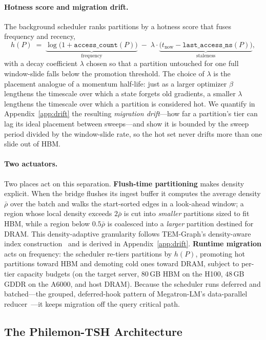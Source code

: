 \documentclass[10pt]{article}
\theoremstyle{definition}
\begin{document}
\paragraph{Hotness score and migration drift.}
The background scheduler ranks partitions by a hotness score that fuses frequency
and recency,
\[
  h(P) \;=\; \underbrace{\log\!\big(1 + \texttt{access\_count}(P)\big)}_{\text{frequency}}
            \;-\; \lambda \cdot \underbrace{\big(t_{\text{now}} - \texttt{last\_access\_ns}(P)\big)}_{\text{staleness}},
\]
with a decay coefficient $\lambda$ chosen so that a partition untouched for one
full window-slide falls below the promotion threshold. The choice of $\lambda$ is
the placement analogue of a momentum half-life: just as a larger optimizer
$\beta$ lengthens the timescale over which a state forgets old gradients, a smaller
$\lambda$ lengthens the timescale over which a partition is considered hot. We
quantify in Appendix~\ref{app:drift} the resulting \emph{migration drift}---how far
a partition's tier can lag its ideal placement between sweeps---and show it is
bounded by the sweep period divided by the window-slide rate, so the hot set never
drifts more than one slide out of HBM.

\paragraph{Two actuators.}
Two places act on this separation. \textbf{Flush-time partitioning} makes density
explicit. When the bridge flushes its ingest buffer it computes the average density
$\bar\rho$ over the batch and walks the start-sorted edges in a look-ahead window;
a region whose local density exceeds $2\bar\rho$ is cut into \emph{smaller}
partitions sized to fit HBM, while a region below $0.5\bar\rho$ is coalesced into a
\emph{larger} partition destined for DRAM. This density-adaptive granularity
follows TEM-Graph's density-aware index construction~\citep{temgraph} and is
derived in Appendix~\ref{app:drift}. \textbf{Runtime migration} acts on frequency:
the scheduler re-tiers partitions by $h(P)$, promoting hot partitions toward HBM
and demoting cold ones toward DRAM, subject to per-tier capacity budgets (on the
target server, $80$\,GB HBM on the H100, $48$\,GB GDDR on the A6000, and host
DRAM). Because the scheduler runs deferred and batched---the grouped, deferred-hook
pattern of Megatron-LM's data-parallel reducer~\citep{shoeybi2019megatron}---it
keeps migration off the query critical path.

\subsection{The Philemon-TSH Architecture}
\label{sec:architecture}
\end{document}
